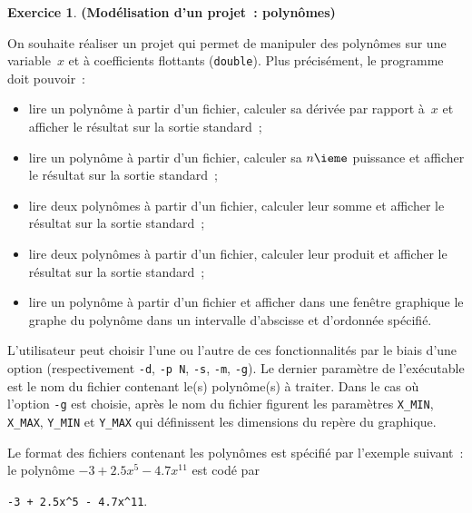 \documentclass[12pt]{article}
\theoremstyle{definition}
\newtheorem{Exercice}{Exercice}
\begin{document}
\begin{Exercice} {\bf (Modélisation d'un projet~: polynômes)} \smallskip

    On souhaite réaliser un projet qui permet de manipuler des polynômes
    sur une variable~$x$ et à coefficients flottants ({\tt double}).
    Plus précisément, le programme doit pouvoir~:
    \begin{itemize}
        \item lire un polynôme à partir d'un fichier, calculer sa
        dérivée par rapport à~$x$ et afficher le résultat sur la sortie standard~;
        \smallskip

        \item lire un polynôme à partir d'un fichier, calculer sa $n\ieme$
        puissance et afficher le résultat sur la sortie standard~;
        \smallskip

        \item lire deux polynômes à partir d'un fichier, calculer
        leur somme et afficher le résultat sur la sortie standard~;
        \smallskip

        \item lire deux polynômes à partir d'un fichier, calculer
        leur produit et afficher le résultat sur la sortie standard~;
        \smallskip

        \item lire un polynôme à partir d'un fichier et afficher dans
        une fenêtre graphique le graphe du polynôme dans un intervalle
        d'abscisse et d'ordonnée spécifié.
        \smallskip
    \end{itemize}
    L'utilisateur peut choisir l'une ou l'autre de ces fonctionnalités
    par le biais d'une option (respectivement {\tt -d}, {\tt -p N},
    {\tt -s}, {\tt -m}, {\tt -g}). Le dernier paramètre de l'exécutable
    est le nom du fichier contenant le(s) polynôme(s) à traiter.
    Dans le cas où l'option {\tt -g} est choisie, après le nom du fichier
    figurent les paramètres {\tt X\_MIN}, {\tt X\_MAX}, {\tt Y\_MIN} et
    {\tt Y\_MAX} qui définissent les dimensions du repère du graphique.
    \smallskip

    Le format des fichiers contenant les polynômes est spécifié par
    l'exemple suivant~: le polynôme $-3 + 2.5x^5 - 4.7x^{11}$ est
    codé par
    \begin{center}
        {\tt -3 + 2.5x\^{}5 - 4.7x\^{}11}.
    \end{center}
    \smallskip


\end{Exercice}
\end{document}
